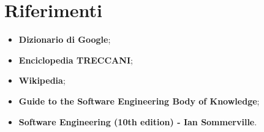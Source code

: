 \section{Riferimenti}

\begin{itemize}
\item \textbf{Dizionario di Google};
\item \textbf{Enciclopedia TRECCANI};
\item \textbf{Wikipedia};
\item \textbf{Guide to the Software Engineering Body of Knowledge};
\item \textbf{Software Engineering (10th edition) - Ian Sommerville}.
\end{itemize}

\clearpage